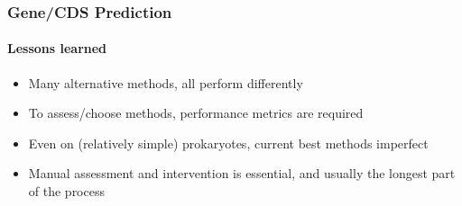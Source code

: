 \begin{frame}
   \frametitle{Gene/CDS Prediction}   
   \framesubtitle{Lessons learned}   
   \begin{itemize}
     \item Many alternative methods, all perform differently
     \item To assess/choose methods, performance metrics are required
     \item Even on (relatively simple) prokaryotes, current best methods imperfect
     \item Manual assessment and intervention is essential, and usually the longest part of the process
   \end{itemize}
\end{frame}
